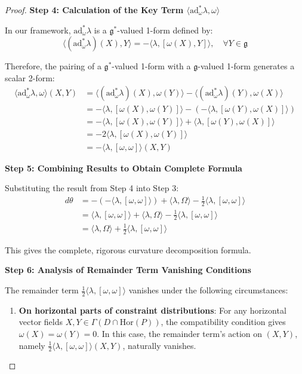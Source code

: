 \documentclass[a4paper,12pt]{extarticle}
\theoremstyle{definition}
\begin{document}
\begin{proof}
\textbf{Step 4: Calculation of the Key Term $\langle\text{ad}_\omega^* \lambda, \omega\rangle$}

In our framework, $\text{ad}_\omega^* \lambda$ is a $\mathfrak{g}^*$-valued 1-form defined by:
$$\langle(\text{ad}_\omega^* \lambda)(X), Y\rangle = -\langle\lambda, [\omega(X), Y]\rangle, \quad \forall Y \in \mathfrak{g}$$

Therefore, the pairing of a $\mathfrak{g}^*$-valued 1-form with a $\mathfrak{g}$-valued 1-form generates a scalar 2-form:
\begin{align}
\langle\text{ad}_\omega^* \lambda, \omega\rangle(X, Y) &= \langle(\text{ad}_\omega^* \lambda)(X), \omega(Y)\rangle - \langle(\text{ad}_\omega^* \lambda)(Y), \omega(X)\rangle \\
&= -\langle\lambda, [\omega(X), \omega(Y)]\rangle - (-\langle\lambda, [\omega(Y), \omega(X)]\rangle) \\
&= -\langle\lambda, [\omega(X), \omega(Y)]\rangle + \langle\lambda, [\omega(Y), \omega(X)]\rangle \\
&= -2\langle\lambda, [\omega(X), \omega(Y)]\rangle \\
&= -\langle\lambda, [\omega, \omega]\rangle(X, Y)
\end{align}

\textbf{Step 5: Combining Results to Obtain Complete Formula}

Substituting the result from Step 4 into Step 3:
\begin{align}
d\theta &= -(-\langle\lambda, [\omega, \omega]\rangle) + \langle\lambda, \Omega\rangle - \frac{1}{2}\langle\lambda, [\omega, \omega]\rangle \\
&= \langle\lambda, [\omega, \omega]\rangle + \langle\lambda, \Omega\rangle - \frac{1}{2}\langle\lambda, [\omega, \omega]\rangle \\
&= \langle\lambda, \Omega\rangle + \frac{1}{2}\langle\lambda, [\omega, \omega]\rangle
\end{align}

This gives the complete, rigorous curvature decomposition formula.

\textbf{Step 6: Analysis of Remainder Term Vanishing Conditions}

The remainder term $\frac{1}{2}\langle\lambda, [\omega, \omega]\rangle$ vanishes under the following circumstances:

\begin{enumerate}
\item \textbf{On horizontal parts of constraint distributions}: For any horizontal vector fields $X, Y \in \Gamma(D \cap \text{Hor}(P))$, the compatibility condition gives $\omega(X) = \omega(Y) = 0$. In this case, the remainder term's action on $(X,Y)$, namely $\frac{1}{2}\langle\lambda, [\omega, \omega]\rangle(X,Y)$, naturally vanishes.


\end{enumerate}
\end{proof}
\end{document}
